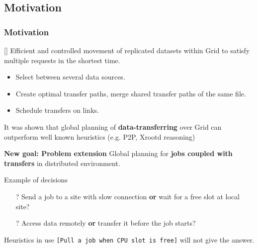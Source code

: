 \documentclass{beamer}
\begin{document}
\subsection{Motivation}
\begin{frame}\frametitle{Motivation}
\begin{footnotesize}
\begin{block}{[\cite{Zerola}]}
Efficient and controlled movement of replicated datasets within Grid to satisfy multiple requests in the shortest time. 
 \begin{itemize}
\item Select between several data sources. 
\item Create optimal transfer paths, merge shared transfer paths of the same file.
\item Schedule transfers on links.
\end{itemize} 
It was shown that global planning of \textbf{data-transferring} over Grid can outperform well known heuristics (e.g. P2P, Xrootd reasoning)
\end{block}  
 		\begin{block}{\textbf{New goal: Problem extension}}
Global planning for \textbf{jobs coupled with transfers} in distributed environment.
 	\end{block} 	
\vspace{-2mm}
\begin{block}{Example of decisions} 
		\begin{itemize}
			\item[?] Send a job to a site with slow connection \textbf{or} wait for a free slot at local site?
		\item[?] Access data remotely \textbf{or} transfer it before the job starts?	
		\end{itemize}
\vspace{-2mm}		
Heuristics in use  \texttt{[Pull a job when CPU slot is free]} will not give the answer.

\end{block}  	 	
\end{footnotesize} 	
\end{frame}
\end{document}
